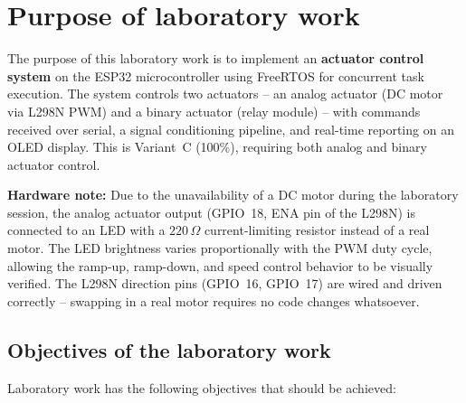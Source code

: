 \section{Purpose of laboratory work}

The purpose of this laboratory work is to implement an \textbf{actuator control system}
on the ESP32 microcontroller using FreeRTOS for concurrent task execution. The system
controls two actuators -- an analog actuator (DC motor via L298N PWM) and a binary
actuator (relay module) -- with commands received over serial, a signal conditioning
pipeline, and real-time reporting on an OLED display.
This is Variant~C (100\%), requiring both analog and binary actuator control.

\textbf{Hardware note:} Due to the unavailability of a DC motor during the laboratory
session, the analog actuator output (GPIO~18, ENA pin of the L298N) is connected to an
LED with a $220\,\Omega$ current-limiting resistor instead of a real motor. The LED
brightness varies proportionally with the PWM duty cycle, allowing the ramp-up,
ramp-down, and speed control behavior to be visually verified. The L298N direction pins
(GPIO~16, GPIO~17) are wired and driven correctly -- swapping in a real motor requires
no code changes whatsoever.

\subsection{Objectives of the laboratory work}

Laboratory work has the following objectives that should be achieved:

